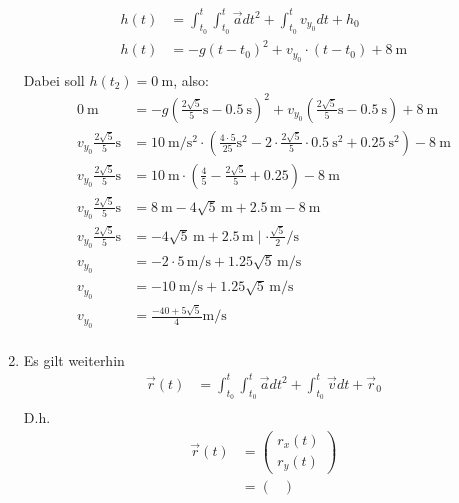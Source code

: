 \documentclass[sectionformat = aufgabe]{gadsescript}
\begin{document}
\begin{enumerate}[label=\alph*)]
		\begin{align*}
			h(t) &= \int_{t_0}^{t} \int_{t_0}^{t} \vec a dt^2 + \int_{t_0}^{t} v_{y_0} dt + h_0\\
			h(t) &= - g(t- t_0)^2 + v_{y_0} \cdot (t-t_0) + \qty{8}{\metre}\\
		\end{align*}
		Dabei soll $ h(t_2) = \qty{0}{\metre} $, also:
		\begin{align*}
			\qty{0}{\metre}  &= -g\left(\frac{2\sqrt{5}}{5}\unit{\second} - \qty{0.5}{\second} \right)^2 + v_{y_0} \left(\frac{2\sqrt{5}}{5}\unit{\second} - \qty{0.5}{\second} \right)  + \qty{8}{\metre} \\
			v_{y_0} \frac{2\sqrt{5}}{5}\unit{\second} &=%
			\qty{10}{\metre\per\square\second}\cdot\left(%
				\frac{4\cdot5}{25}\unit{\square\second} - 2\cdot\frac{2\sqrt{5}}{5}\cdot\qty{0.5}{\square\second} + \qty{0.25}{\square\second} \right)%
				- \qty{8}{\metre}\\
			v_{y_0} \frac{2\sqrt{5}}{5}\unit{\second} &= \qty{10}{\metre}\cdot\left(\frac{4}{5} - \frac{2\sqrt{5}}{5} + 0.25 \right)-  \qty{8}{\metre}\\
			v_{y_0} \frac{2\sqrt{5}}{5}\unit{\second} &= \qty{8}{\metre} - 4\sqrt{5}\,\unit{\metre} + 2.5\,\unit{\metre} -  \qty{8}{\metre}\\
			v_{y_0} \frac{2\sqrt{5}}{5}\unit{\second} &= - 4\sqrt{5}\,\unit{\metre} + 2.5\,\unit{\metre} \mid \cdot \frac{\sqrt{5}}{2}\unit{\per\second}\\
			v_{y_0} &=  - 2\cdot5\,\unit{\metre\per\second} + 1.25\sqrt{5}\,\unit{\metre\per\second} \\
			v_{y_0} &=  - \qty{10}{\metre\per\second} + 1.25\sqrt{5}\,\unit{\metre\per\second} \\
			v_{y_0} &=  \frac{- 40 + 5\sqrt{5}}{4}\unit{\metre\per\second} \\
		\end{align*}
	\item Es gilt weiterhin
		\begin{align*}
			\vec r(t) &= \int_{t_0}^{t} \int_{t_0}^{t} \vec a dt^2 + \int_{t_0}^{t} \vec v dt + \vec r_0\\
		\end{align*}
		D.h.
		\begin{align*}
			\vec r(t) &= \begin{pmatrix} r_x(t)\\r_y(t)\end{pmatrix} \\
				~&= \begin{pmatrix}

\end{pmatrix}
\end{align*}
\end{enumerate}
\end{document}
